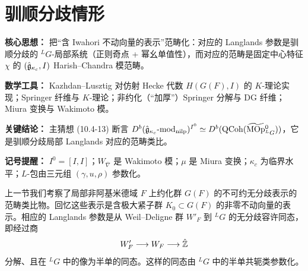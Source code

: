 
\section{驯顺分歧情形}

\begin{keypoints}
    \item \textbf{核心思想：} 把“含 Iwahori 不动向量的表示”范畴化：对应的 Langlands 参数是驯顺分歧的 ${}^L G$-局部系统（正则奇点 + 幂幺单值性），而对应的范畴是固定中心特征 $\chi$ 的 $(\hat{\mathfrak{g}}_{\kappa_c},I)$ Harish--Chandra 模范畴。
    \item \textbf{数学工具：} Kazhdan--Lusztig 对仿射 Hecke 代数 $H(G(F),I)$ 的 $K$-理论实现；Springer 纤维与 $K$-理论；非约化（“加厚”）Springer 分解与 DG 纤维；Miura 变换与 Wakimoto 模。
    \item \textbf{关键结论：} 主猜想 (10.4-13) 断言 $D^b(\hat{\mathfrak{g}}_{\kappa_c}\text{-}\mathrm{mod}_{\mathrm{nilp}})^{I^0}\simeq D^b(\mathrm{QCoh}(\widetilde{\mathrm{MOp}}{}^0_{{}^L G}))$，它是驯顺分歧局部 Langlands 对应的范畴类比。
    \item \textbf{记号提醒：} $I^0=[I,I]$；$W_{\overline{\nabla}}$ 是 Wakimoto 模；$\mu$ 是 Miura 变换；$\kappa_c$ 为临界水平；$L$-包由三元组 $(\gamma,u,\rho)$ 参数化。
\end{keypoints}

上一节我们考察了局部非阿基米德域 $F$ 上约化群 $G(F)$ 的不可约无分歧表示的范畴类比物。回忆这些表示是含极大紧子群 $K_0\subset G(F)$ 的非零不动向量的表示。相应的 Langlands 参数是从 Weil--Deligne 群 $W'_F$ 到 ${}^L G$ 的无分歧容许同态，即经过商
\[
    W'_F\longrightarrow W_F\longrightarrow\hat{\mathbb{Z}}
\]
分解、且在 ${}^L G$ 中的像为半单的同态。这样的同态由 ${}^L G$ 中的半单共轭类参数化。


